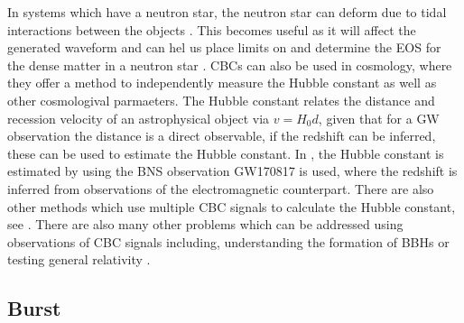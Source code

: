 In systems which have a neutron star, the neutron star can deform due to tidal interactions between the objects
\citep{flanagan2008ConstrainingNeutronstar}.  This becomes useful as it will
affect the generated waveform and can hel us place limits on and determine the
\gls{EOS} for the dense matter in a neutron star
\citep{harry2018ObservingMeasuring}.
\glspl{CBC} can also be used in cosmology, where they offer a method to independently measure the Hubble constant as well as other cosmologival parmaeters.
The Hubble constant relates the distance and recession velocity of an astrophysical object via $v = H_0 d$, given that for a \gls{GW} observation the distance is a direct observable, if the redshift can be inferred, these can be used to estimate the Hubble constant. 
In \cite{theligoscientificcollaborationandthevirgocollaboration2017GravitationalwaveStandard}, the Hubble constant is estimated by using the \gls{BNS} observation GW170817 \citep{abbott2017GW170817Observation} is used, where the redshift is inferred from observations of the electromagnetic counterpart.  There are also other methods which use multiple \gls{CBC} signals to calculate the Hubble constant, see \citep{delpozzo2012InferenceCosmological}.
There are also many other problems which can be addressed using observations of \gls{CBC} signals including, understanding the formation of \glspl{BBH} \citep{zevin2017ConstrainingFormation,mandel2018MergingStellarmass} or testing general relativity \citep{}.  



\subsection{\label{sources:transient:burst}Burst}

